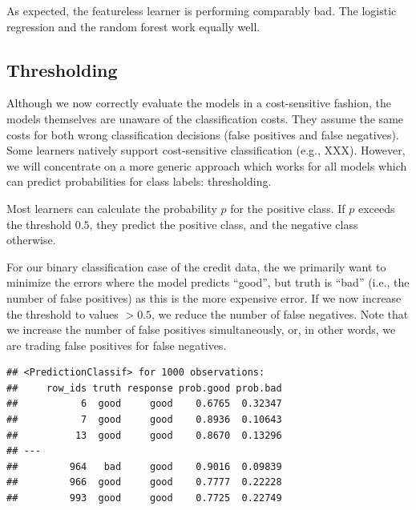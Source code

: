\documentclass[
]{scrbook}
\newenvironment{Shaded}{\begin{snugshade}}{\end{snugshade}}
\newcommand{\AttributeTok}[1]{\textcolor[rgb]{0.77,0.63,0.00}{#1}}
\newcommand{\CommentTok}[1]{\textcolor[rgb]{0.56,0.35,0.01}{\textit{#1}}}
\newcommand{\FunctionTok}[1]{\textcolor[rgb]{0.00,0.00,0.00}{#1}}
\newcommand{\NormalTok}[1]{#1}
\newcommand{\OtherTok}[1]{\textcolor[rgb]{0.56,0.35,0.01}{#1}}
\newcommand{\SpecialCharTok}[1]{\textcolor[rgb]{0.00,0.00,0.00}{#1}}
\newcommand{\StringTok}[1]{\textcolor[rgb]{0.31,0.60,0.02}{#1}}
\renewenvironment{Shaded} {\begin{snugshade}\small} {\end{snugshade}}
\begin{document}
As expected, the featureless learner is performing comparably bad.
The logistic regression and the random forest work equally well.

\hypertarget{thresholding}{%
\subsection{Thresholding}\label{thresholding}}

Although we now correctly evaluate the models in a cost-sensitive fashion, the models themselves are unaware of the classification costs.
They assume the same costs for both wrong classification decisions (false positives and false negatives).
Some learners natively support cost-sensitive classification (e.g., XXX).
However, we will concentrate on a more generic approach which works for all models which can predict probabilities for class labels: thresholding.

Most learners can calculate the probability \(p\) for the positive class.
If \(p\) exceeds the threshold \(0.5\), they predict the positive class, and the negative class otherwise.

For our binary classification case of the credit data, the we primarily want to minimize the errors where the model predicts ``good'', but truth is ``bad'' (i.e., the number of false positives) as this is the more expensive error.
If we now increase the threshold to values \(> 0.5\), we reduce the number of false negatives.
Note that we increase the number of false positives simultaneously, or, in other words, we are trading false positives for false negatives.

\begin{Shaded}
\end{Shaded}

\begin{verbatim}
## <PredictionClassif> for 1000 observations:
##     row_ids truth response prob.good prob.bad
##           6  good     good    0.6765  0.32347
##           7  good     good    0.8936  0.10643
##          13  good     good    0.8670  0.13296
## ---                                          
##         964   bad     good    0.9016  0.09839
##         966  good     good    0.7777  0.22228
##         993  good     good    0.7725  0.22749
\end{verbatim}
\end{document}
